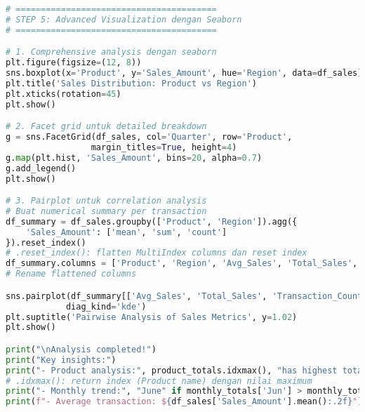 \begin{lstlisting}[language=python, caption={Visualisasi dengan Matplotlib dan Seaborn}, style=python]
# ========================================
# STEP 5: Advanced Visualization dengan Seaborn
# ========================================

# 1. Comprehensive analysis dengan seaborn
plt.figure(figsize=(12, 8))
sns.boxplot(x='Product', y='Sales_Amount', hue='Region', data=df_sales)
plt.title('Sales Distribution: Product vs Region')
plt.xticks(rotation=45)
plt.show()

# 2. Facet grid untuk detailed breakdown
g = sns.FacetGrid(df_sales, col='Quarter', row='Product',
                 margin_titles=True, height=4)
g.map(plt.hist, 'Sales_Amount', bins=20, alpha=0.7)
g.add_legend()
plt.show()

# 3. Pairplot untuk correlation analysis
# Buat numerical summary per transaction
df_summary = df_sales.groupby(['Product', 'Region']).agg({
    'Sales_Amount': ['mean', 'sum', 'count']
}).reset_index()
# .reset_index(): flatten MultiIndex columns dan reset index
df_summary.columns = ['Product', 'Region', 'Avg_Sales', 'Total_Sales', 'Transaction_Count']
# Rename flattened columns

sns.pairplot(df_summary[['Avg_Sales', 'Total_Sales', 'Transaction_Count']],
            diag_kind='kde')
plt.suptitle('Pairwise Analysis of Sales Metrics', y=1.02)
plt.show()

print("\nAnalysis completed!")
print("Key insights:")
print("- Product analysis:", product_totals.idxmax(), "has highest total sales")
# .idxmax(): return index (Product name) dengan nilai maximum
print("- Monthly trend:", "June" if monthly_totals['Jun'] > monthly_totals['Jan'] else "January", "performs better")
print(f"- Average transaction: ${df_sales['Sales_Amount'].mean():.2f}")
\end{lstlisting}

